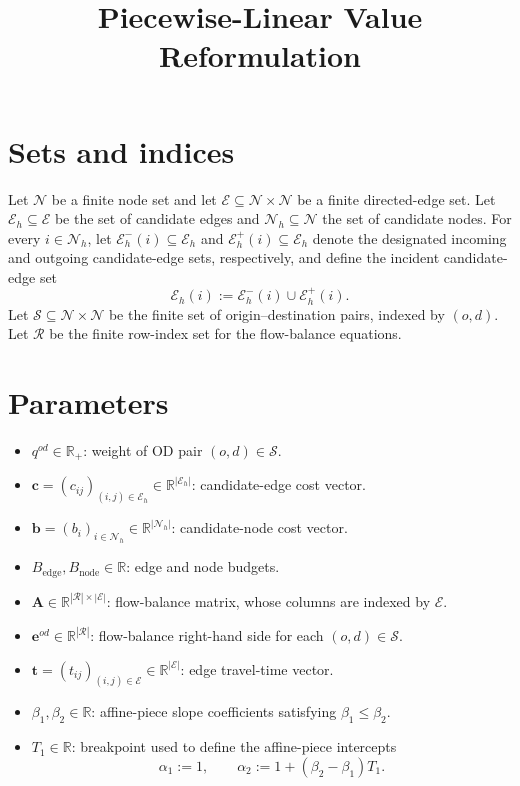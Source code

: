 \documentclass{article}
\title{Piecewise-Linear Value Reformulation}
\author{}
\date{}
\begin{document}
\maketitle

\section*{Sets and indices}
Let \(\mathcal N\) be a finite node set and let \(\mathcal E\subseteq\mathcal N\times\mathcal N\) be a finite directed-edge set. Let \(\mathcal E_h\subseteq\mathcal E\) be the set of candidate edges and \(\mathcal N_h\subseteq\mathcal N\) the set of candidate nodes. For every \(i\in\mathcal N_h\), let \(\mathcal E_h^{-}(i)\subseteq\mathcal E_h\) and \(\mathcal E_h^{+}(i)\subseteq\mathcal E_h\) denote the designated incoming and outgoing candidate-edge sets, respectively, and define the incident candidate-edge set
\[
\mathcal E_h(i):=\mathcal E_h^{-}(i)\cup\mathcal E_h^{+}(i).
\]
Let \(\mathcal S\subseteq\mathcal N\times\mathcal N\) be the finite set of origin--destination pairs, indexed by \((o,d)\). Let \(\mathcal R\) be the finite row-index set for the flow-balance equations.

\section*{Parameters}
\begin{itemize}
    \item \(q^{od}\in\mathbb R_+\): weight of OD pair \((o,d)\in\mathcal S\).
    \item \(\mathbf c=(c_{ij})_{(i,j)\in\mathcal E_h}\in\mathbb R^{|\mathcal E_h|}\): candidate-edge cost vector.
    \item \(\mathbf b=(b_i)_{i\in\mathcal N_h}\in\mathbb R^{|\mathcal N_h|}\): candidate-node cost vector.
    \item \(B_{\mathrm{edge}},B_{\mathrm{node}}\in\mathbb R\): edge and node budgets.
    \item \(\mathbf A\in\mathbb R^{|\mathcal R|\times|\mathcal E|}\): flow-balance matrix, whose columns are indexed by \(\mathcal E\).
    \item \(\mathbf e^{od}\in\mathbb R^{|\mathcal R|}\): flow-balance right-hand side for each \((o,d)\in\mathcal S\).
    \item \(\mathbf t=(t_{ij})_{(i,j)\in\mathcal E}\in\mathbb R^{|\mathcal E|}\): edge travel-time vector.
    \item \(\beta_1,\beta_2\in\mathbb R\): affine-piece slope coefficients satisfying \(\beta_1\leq\beta_2\).
    \item \(T_1\in\mathbb R\): breakpoint used to define the affine-piece intercepts
    \[
    \alpha_1:=1,
    \qquad
    \alpha_2:=1+(\beta_2-\beta_1)T_1.
    \]
\end{itemize}
\end{document}
